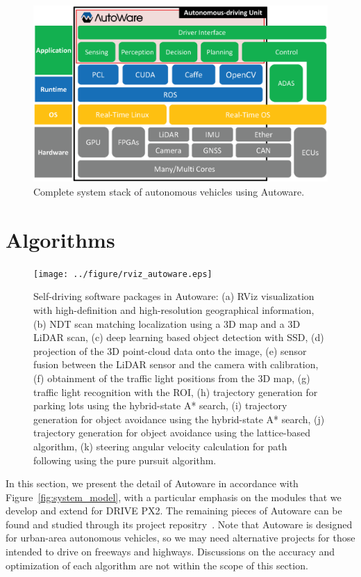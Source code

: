 \begin{figure}[htbp]
  \centering
  \includegraphics[width=0.9\linewidth]{../figure/system_stack.eps}
  \caption{\label{fig:system_stack}
  Complete system stack of autonomous vehicles using Autoware.}
\end{figure}


\section{Algorithms}
\label{sec:system_model}

\begin{figure}[htbp]
    \centering
    \texttt{[image: ../figure/rviz\_autoware.eps]}
    \caption{\label{fig:rviz_autoware}
    Self-driving software packages in Autoware:
    (a) RViz visualization with high-definition and high-resolution geographical information,
    (b) NDT scan matching localization using a 3D map and a 3D LiDAR scan,
    (c) deep learning based object detection with SSD, 
    (d) projection of the 3D point-cloud data onto the image, 
    (e) sensor fusion between the LiDAR sensor and the camera with calibration,
    (f) obtainment of the traffic light positions from the 3D map,
    (g) traffic light recognition with the ROI,
    (h) trajectory generation for parking lots using the hybrid-state A* search,
    (i) trajectory generation for object avoidance using the hybrid-state A* search,
    (j) trajectory generation for object avoidance using the lattice-based algorithm,
    (k) steering angular velocity calculation for path following using the pure pursuit algorithm.}
\end{figure}

In this section, we present the detail of Autoware in accordance with
Figure~\ref{fig:system_model}, with a particular emphasis on the modules
that we develop and extend for DRIVE PX2.
The remaining pieces of Autoware can be found and studied through its
project repositry~\cite{autoware}.
Note that Autoware is designed for urban-area autonomous vehicles, so we
may need alternative projects for those intended to drive on freeways
and highways.
Discussions on the accuracy and optimization of each algorithm are not
within the scope of this section.


